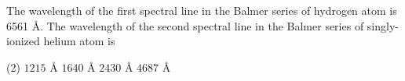 
\item The wavelength of the first spectral line in the Balmer series of hydrogen atom is 6561 \AA. The wavelength of the second spectral line in the Balmer series of singly-ionized helium atom is
    \begin{tasks}(2)
        \task \( 1215 \) \AA
        \task \( 1640 \) \AA
        \task \( 2430 \) \AA
        \task \( 4687 \) \AA
    \end{tasks}
